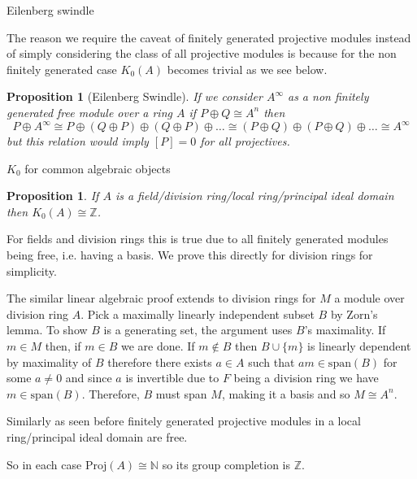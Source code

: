 \documentclass{beamer}
\newcommand{\Z}{\mathbb{Z}}
\newcommand{\N}{\mathbb{N}}
\newcounter{dummy} \numberwithin{dummy}{section}
\newtheorem{proposition}[dummy]{Proposition}
\begin{document}
\begin{frame}{Eilenberg swindle}

	The reason we require the caveat of finitely generated projective modules instead of simply considering the class of all projective modules is because for the non finitely generated case $K_0(A)$ becomes trivial as we see below.
	\begin{proposition}[Eilenberg Swindle] If we consider $A^\infty$ as a non finitely generated free module over a ring $A$ if $P \oplus Q \cong A^n$ then \[ P \oplus A^\infty \cong P \oplus (Q \oplus P) \oplus (Q \oplus P) \oplus \dots \cong (P \oplus Q) \oplus (P \oplus Q) \oplus \dots \cong A^\infty \] but this relation would imply $[P]=0 $ for all projectives. 
	\end{proposition}
\end{frame}
\begin{frame}[allowframebreaks]{$K_0$ for common algebraic objects}
	\begin{proposition}\label{k0pidisZ}
		If $A$ is a field/division ring/local ring/principal ideal domain then $K_0(A)\cong\Z$.
	\end{proposition}

		For fields and division rings this is true due to all finitely generated modules being free, i.e. having a basis. We prove this directly for division rings for simplicity.
		
		The similar linear algebraic proof extends to division rings for $M$ a module over division ring $A$. Pick a maximally linearly independent subset $B$ by Zorn's lemma. To show \( B \) is a generating set, the argument uses \( B \)'s maximality. If \( m \in M \) then, if $m \in B$ we are done. If $m \not \in B$ then $B \cup \{m\}$ is linearly dependent by maximality of $B$ therefore there exists $a\in A$ such that $am \in \mathrm{span}(B)$ for some $a \neq 0$ and since $a $ is invertible due to $F$ being a division ring we have $m \in \mathrm{span}(B)$.
		Therefore, \( B \) must span \( M \), making it a basis and so $ M \cong A^n$.
		
		Similarly as seen before finitely generated projective modules in a local ring/principal ideal domain are free.
		
		So in each case $\mathrm{Proj}(A) \cong \N$ so its group completion is $\Z.$ 
		

\end{frame}
\end{document}
